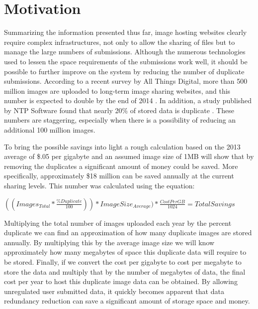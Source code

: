 \section{Motivation} \label{sec:motivation}
Summarizing the information presented thus far, image hosting websites clearly require complex infrastructures, not only to allow the sharing of files but to manage the large numbers of submissions. Although the numerous technologies used to lessen the space requirements of the submissions work well, it should be possible to further improve on the system by reducing the number of duplicate submissions. According to a recent survey by All Things Digital, more than 500 million images are uploaded to long-term image sharing websites, and this number is expected to double by the end of 2014 \cite{meek:500}. In addition, a study published by NTP Software found that nearly 20\% of stored data is duplicate \cite{ntps:staledata}. These numbers are staggering, especially when there is a possibility of reducing an additional 100 million images.

To bring the possible savings into light a rough calculation based on the 2013 average of \$.05 per gigabyte and an assumed image size of 1MB will show that by removing the duplicates a significant amount of money could be saved. More specifically, approximately \$18 million can be saved annually at the current sharing levels. This number was calculated using the equation:
\begin{center}
$((Images_{Total}*\frac{\%Duplicate}{100}))*ImageSize_{Average})*\frac{CostPerGB}{1024}=TotalSavings$
\end{center}
Multiplying the total number of images uploaded each year by the percent duplicate we can find an approximation of how many duplicate images are stored annually. By multiplying this by the average image size we will know approximately how many megabytes of space this duplicate data will require to be stored. Finally, if we convert the cost per gigabyte to cost per megabyte to store the data and multiply that by the number of megabytes of data, the final cost per year to host this duplicate image data can be obtained. By allowing unregulated user submitted data, it quickly becomes apparent that data redundancy reduction can save a significant amount of storage space and money.

